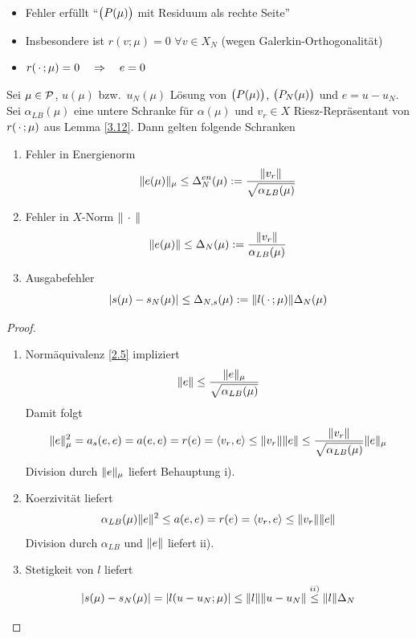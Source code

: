 \begin{bem} \beginwithlistbem
	\begin{itemize}
		\item Fehler erfüllt ``$\big(P(\mu)\big)$ mit Residuum als rechte Seite''
		\item Insbesondere ist $r(v;\mu) = 0$ $\forall v \in X_N$ (wegen Galerkin-Orthogonalität)
		\item $r(\,\cdot\,;\mu) = 0 \quad \Rightarrow \quad e = 0$
	\end{itemize}
\end{bem}

\begin{satz} \label{3.13}
	Sei $\mu \in \mathcal{P}$, $u(\mu)$ bzw.\ $u_N(\mu)$ Lösung von $\big(P(\mu)\big)$, $\big(P_N(\mu)\big)$ und $e=u-u_N$.
	Sei $\alpha_{LB}(\mu)$ eine untere Schranke für $\alpha(\mu)$ und $v_r \in X$ Riesz-Repräsentant von $r(\,\cdot\,;\mu)$ aus Lemma \ref{3.12}.
	Dann gelten folgende Schranken
	\begin{enumerate}
		\item Fehler in Energienorm
			\[
				\|e(\mu)\|_\mu \leq \Delta_N^{en}(\mu) := \frac{\|v_r\|}{\sqrt{\alpha_{LB}(\mu)}}
			\]
		\item Fehler in $X$-Norm $\|\,\cdot\,\|$
			\[
				\|e(\mu)\| \leq \Delta_N(\mu) := \frac{\|v_r\|}{\alpha_{LB}(\mu)}
			\]
		\item Ausgabefehler
			\[
				|s(\mu)-s_N(\mu)| \leq \Delta_{N,s}(\mu) := \|l(\,\cdot\,;\mu)\| \Delta_N(\mu)
			\]
	\end{enumerate}

	\begin{proof} \beginwithlistbew
		\begin{enumerate}
			\item Normäquivalenz \ref{2.5} impliziert
				\[
					\|e\| \leq \frac{\|e\|_\mu}{\sqrt{\alpha_{LB}(\mu)}}
				\]
				Damit folgt
				\[
					\|e\|_\mu^2 = a_s(e,e) = a(e,e) = r(e) = \langle v_r, e \rangle \leq \|v_r\| \|e\| \leq \frac{\|v_r\|}{\sqrt{\alpha_{LB}(\mu)}} \|e\|_\mu
				\]
				Division durch $\|e\|_\mu$ liefert Behauptung i).
			\item Koerzivität liefert
				\[
					\alpha_{LB}(\mu) \|e\|^2 \leq a(e,e) = r(e) = \langle v_r, e \rangle \leq \|v_r\| \|e\|
				\]
				Division durch $\alpha_{LB}$ und $\|e\|$ liefert ii).
			\item Stetigkeit von $l$ liefert
				\[
					|s(\mu)-s_N(\mu)| = |l(u-u_N;\mu)| \leq \|l\| \|u-u_N\| \stackrel{ii)}{\leq} \|l\| \Delta_N
				\]
		\end{enumerate}
	\end{proof}
\end{satz}


